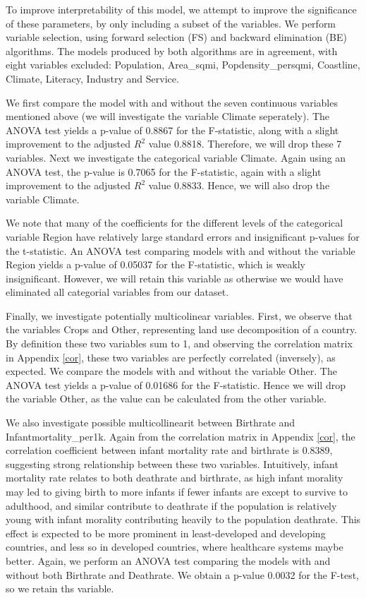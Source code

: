 \documentclass[12pt,a4paper]{article}
\renewcommand\texttt[1]{{\ttfamily\color{ttcolor}#1}}
\begin{document}
To improve interpretability of this model, we attempt to improve the significance of these parameters, by only including a subset of the variables. We perform variable selection, using forward selection (FS) and backward elimination (BE) algorithms. The models produced by both algorithms are in agreement, with eight variables excluded: \texttt{Population}, \texttt{Area\_sqmi}, \texttt{Popdensity\_persqmi}, \texttt{Coastline}, \texttt{Climate}, \texttt{Literacy}, \texttt{Industry} and \texttt{Service}. 

We first compare the model with and without the seven continuous variables mentioned above (we will investigate the variable \texttt{Climate} seperately). The ANOVA test yields a p-value of 0.8867 for the F-statistic, along with a slight improvement to the adjusted $R^2$ value 0.8818. Therefore, we will drop these 7 variables. Next we investigate the categorical variable \texttt{Climate}. Again using an ANOVA test, the p-value is 0.7065 for the F-statistic, again with a slight improvement to the adjusted $R^2$ value 0.8833. Hence, we will also drop the variable \texttt{Climate}.

We note that many of the coefficients for the different levels of the categorical variable \texttt{Region} have relatively large standard errors and insignificant p-values for the t-statistic. An ANOVA test comparing models with and without the variable \texttt{Region} yields a p-value of 0.05037 for the F-statistic, which is weakly insignificant. However, we will retain this variable as otherwise we would have eliminated all categorial variables from our dataset. 

Finally, we investigate potentially multicolinear variables. First, we observe that the variables \texttt{Crops} and \texttt{Other}, representing land use decomposition of a country. By definition these two variables sum to 1, and observing the correlation matrix in Appendix \ref{cor}, these two variables are perfectly correlated (inversely), as expected. We compare the models with and without the variable \texttt{Other}. The ANOVA test yields a p-value of 0.01686 for the F-statistic. Hence we will drop the variable \texttt{Other}, as the value can be calculated from the other variable.

We also investigate possible multicollinearit between \texttt{Birthrate} and \texttt{Infantmortality\_per1k}. Again from the correlation matrix in Appendix \ref{cor}, the correlation coefficient between infant mortality rate and birthrate is 0.8389, suggesting strong relationship between these two variables. Intuitively, infant mortality rate relates to both deathrate and birthrate, as high infant morality may led to giving birth to more infants if fewer infants are except to survive to adulthood, and similar contribute to deathrate if the population is relatively young with infant morality contributing heavily to the population deathrate. This effect is expected to be more prominent in least-developed and developing countries, and less so in developed countries, where healthcare systems maybe better. Again, we perform an ANOVA test comparing the models with and without both \texttt{Birthrate} and \texttt{Deathrate}. We obtain a p-value 0.0032 for the F-test, so we retain ths variable.
\end{document}
